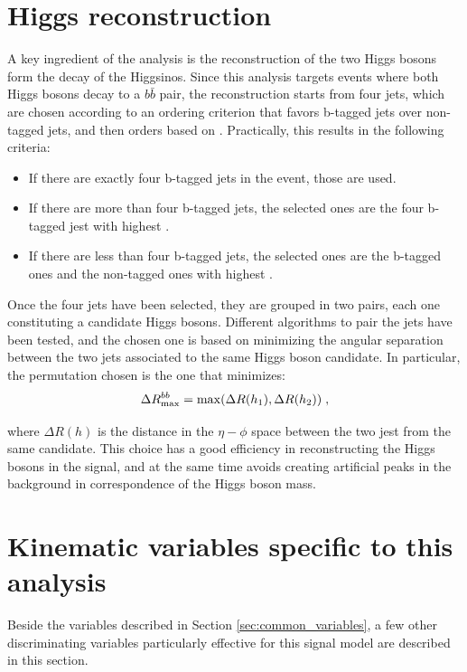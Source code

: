\section{Higgs reconstruction}
\label{sec:ewk:higgsreco}

A key ingredient of the analysis is the reconstruction of the two Higgs bosons form the decay of the Higgsinos.
Since this analysis targets events where both Higgs bosons decay to a $b\bar{b}$ pair, the reconstruction starts 
from four jets, which are chosen according to an ordering criterion that favors b-tagged jets over non-tagged jets,
and then orders based on \pt. Practically, this results in the following criteria:
\begin{itemize}
\item If there are exactly four b-tagged jets in the event, those are used.
\item If there are more than four b-tagged jets, the selected ones are the four b-tagged jest with highest \pt.
\item If there are less than four b-tagged jets, the selected ones are the b-tagged ones and the non-tagged ones with highest \pt.
\end{itemize} 

Once the four jets have been selected, they are grouped in two pairs, each one constituting a candidate Higgs bosons. 
Different algorithms to pair the jets have been tested, and the chosen one is based on minimizing the angular separation 
between the two jets associated to the same Higgs boson candidate. 
In particular, the permutation chosen is the one that minimizes:
\begin{equation}
\Delta R_{\mathrm{max}}^{bb} = \mathrm{max}(\Delta R(h_1), \Delta R(h_2)) \; ,
\end{equation}

\noindent where $\Delta R(h)$ is the distance in the $\eta-\phi$ space between the two jest from the same candidate.
This choice has a good efficiency in reconstructing the Higgs bosons in the signal, 
and at the same time avoids creating artificial peaks in the background in correspondence of the Higgs boson mass. 

\section{Kinematic variables specific to this analysis}

Beside the variables described in Section \ref{sec:common_variables}, a few other discriminating variables particularly 
effective for this signal model are described in this section.

